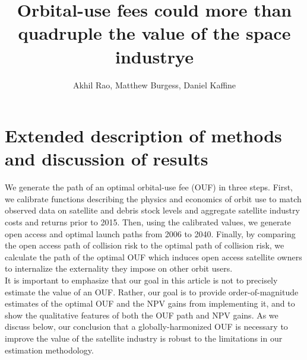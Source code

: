 \documentclass[9pt,twoside,lineno]{pnas-new}
\title{Orbital-use fees could more than quadruple the value of the space industrye}
\author{Akhil Rao, Matthew Burgess, Daniel Kaffine}
\begin{document}
\instructionspage  

\maketitle

\SItext



\section*{Extended description of methods and discussion of results}

We generate the path of an optimal orbital-use fee (OUF) in three steps. First, we calibrate functions describing the physics and economics of orbit use to match observed data on satellite and debris stock levels and aggregate satellite industry costs and returns prior to 2015. Then, using the calibrated values, we generate open access and optimal launch paths from 2006 to 2040. Finally, by comparing the open access path of collision risk to the optimal path of collision risk, we calculate the path of the optimal OUF which induces open access satellite owners to internalize the externality they impose on other orbit users. \\

It is important to emphasize that our goal in this article is not to precisely estimate the value of an OUF. Rather, our goal is to provide order-of-magnitude estimates of the optimal OUF and the NPV gains from implementing it, and to show the qualitative features of both the OUF path and NPV gains. As we discuss below, our conclusion that a globally-harmonized OUF is necessary to improve the value of the satellite industry is robust to the limitations in our estimation methodology.\\ 
\end{document}
